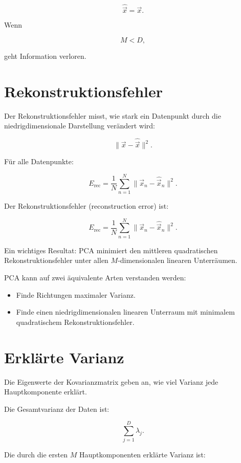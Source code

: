 \[
    \hat{\vec{x}}=\vec{x}.
\]

Wenn

\[
    M<D,
\]

geht Information verloren.

\section{Rekonstruktionsfehler}

Der Rekonstruktionsfehler misst, wie stark ein Datenpunkt durch die niedrigdimensionale Darstellung verändert wird:

\[
    \|\vec{x}-\hat{\vec{x}}\|^2.
\]

Für alle Datenpunkte:

\[
    E_{\mathrm{rec}}
    =
    \frac{1}{N}
    \sum_{n=1}^{N}
    \|\vec{x}_n-\hat{\vec{x}}_n\|^2.
\]

\begin{definitionbox}
Der Rekonstruktionsfehler (reconstruction error) ist:

\[
    E_{\mathrm{rec}}
    =
    \frac{1}{N}
    \sum_{n=1}^{N}
    \|\vec{x}_n-\hat{\vec{x}}_n\|^2.
\]
\end{definitionbox}

Ein wichtiges Resultat:
PCA minimiert den mittleren quadratischen Rekonstruktionsfehler unter allen \(M\)-dimensionalen linearen Unterräumen.

\begin{conceptbox}
PCA kann auf zwei äquivalente Arten verstanden werden:

\begin{itemize}
    \item Finde Richtungen maximaler Varianz.
    \item Finde einen niedrigdimensionalen linearen Unterraum mit minimalem quadratischem Rekonstruktionsfehler.
\end{itemize}
\end{conceptbox}

\section{Erklärte Varianz}

Die Eigenwerte der Kovarianzmatrix geben an, wie viel Varianz jede Hauptkomponente erklärt.

Die Gesamtvarianz der Daten ist:

\[
    \sum_{j=1}^{D}
    \lambda_j.
\]

Die durch die ersten \(M\) Hauptkomponenten erklärte Varianz ist:

